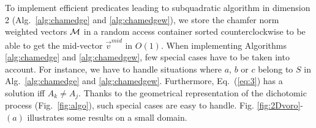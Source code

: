 \documentclass{llncs}
\begin{document}
To implement efficient predicates leading to subquadratic algorithm in
dimension 2 (Alg.~\ref{alg:chamedge} and \ref{alg:chamedgew}), we
store the chamfer norm weighted vectors $\mathcal{M}$ in a random access
container sorted counterclockwise to be able to get the mid-vector
$\vec{v}^{mid}$ in $O(1)$. When implementing Algorithms
\ref{alg:chamedge} and \ref{alg:chamedgew}, few special cases have to
be taken into account. For instance, we have to handle situations
where $a$, $b$ or $c$ belong to $S$ in Alg.~\ref{alg:chamedge} and
\ref{alg:chamedgew}. Furthermore, Eq.~(\ref{eq:3}) has a solution iff
$A_k\neq A_j$. Thanks to the geometrical representation of the
dichotomic process (Fig.~\ref{fig:algo}), such special cases are easy to
handle. Fig. \ref{fig:2Dvoro}-$(a)$ illustrates some results on a small
domain.
\begin{figure}[htbp]
  \begin{center}
\end{center}
\end{figure}
\end{document}
